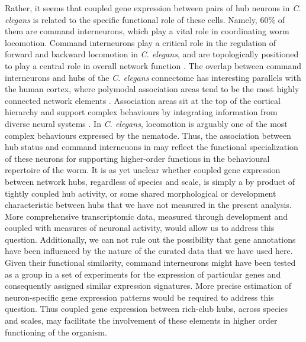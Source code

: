 \documentclass[10pt,letterpaper]{article}
\begin{document}
{Rather, it seems that coupled gene expression between pairs of hub neurons in \textit{C. elegans} is related to the specific functional role of these cells. Namely, 60\% of them are command interneurons, which play a vital role in coordinating worm locomotion. 
Command interneurons play a critical role in the regulation of forward and backward locomotion in \textit{C. elegans}, and are topologically positioned to play a central role in overall network function \cite{Kim2016}. 
The overlap between command interneurons and hubs of the \textit{C. elegans} connectome has interesting parallels with the human cortex, where polymodal association areas tend to be the most highly connected network elements \cite{VandenHeuvel2016}.
Association areas sit at the top of the cortical hierarchy and support complex behaviours by integrating information from diverse neural systems \cite{Mesulam1998}.
In \textit{C. elegans}, locomotion is arguably one of the most complex behaviours expressed by the nematode. 
Thus, the association between hub status and command interneuons in may reflect the functional specialization of these neurons for supporting higher-order functions in the behavioural repertoire of the worm. 
It is as yet unclear whether coupled gene expression between network hubs, regardless of species and scale, is simply a by product of tightly coupled hub activity, or some shared morphological or development characteristic between hubs that we have not measured in the present analysis. 
More comprehensive transcriptomic data, measured through development and coupled with measures of neuronal activity, would allow us to address this question. 
Additionally, we can not rule out the possibility that gene annotations have been influenced by the nature of the curated data that we have used here. 
Given their functional similarity, command interneurons might have been tested as a group in a set of experiments for the expression of particular genes and consequently assigned similar expression signatures.
More precise estimation of neuron-specific gene expression patterns would be required to address this question.  
Thus coupled gene expression between rich-club hubs, across species and scales, may facilitate the involvement of these elements in higher order functioning of the organism.     


}
\end{document}
